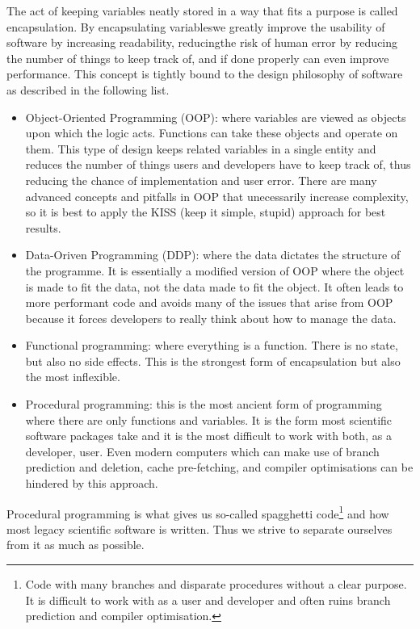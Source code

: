 The act of keeping variables neatly stored in a way that fits a purpose is called encapsulation. By encapsulating variableswe greatly improve the usability of software by increasing readability, reducingthe risk of human error by reducing the number of things to keep track of, and if done properly can even improve performance. This concept is tightly bound to the design philosophy of software as described in the following list.
\begin{itemize}
    \item Object-Oriented Programming (OOP): where variables are viewed as objects upon which the logic acts. Functions can take these objects and operate on them. This type of design keeps related variables in a single entity and reduces the number of things users and developers have to keep track of, thus reducing the chance of implementation and user error. There are many advanced concepts and pitfalls in OOP that unecessarily increase complexity, so it is best to apply the KISS (keep it simple, stupid) approach for best results.
    \item Data-Oriven Programming (DDP): where the data dictates the structure of the programme. It is essentially a modified version of OOP where the object is made to fit the data, not the data made to fit the object. It often leads to more performant code and avoids many of the issues that arise from OOP because it forces developers to really think about how to manage the data.
    \item Functional programming: where everything is a function. There is no state, but also no side effects. This is the strongest form of encapsulation but also the most inflexible.
    \item Procedural programming: this is the most ancient form of programming where there are only functions and variables. It is the form most scientific software packages take and it is the most difficult to work with both, as a developer, user. Even modern computers which can make use of branch prediction and deletion, cache pre-fetching, and compiler optimisations can be hindered by this approach.
\end{itemize}

Procedural programming is what gives us so-called spagghetti code\footnote{Code with many branches and disparate procedures without a clear purpose. It is difficult to work with as a user and developer and often ruins branch prediction and compiler optimisation.} and how most legacy scientific software is written. Thus we strive to separate ourselves from it as much as possible.

